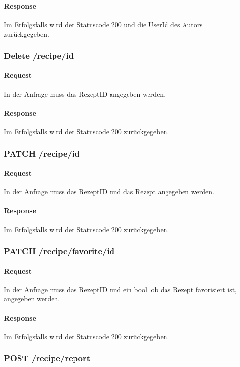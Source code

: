 \documentclass{entwurfsheft}
\begin{document}
    \paragraph{Response}
        Im Erfolgsfalls wird der Statuscode 200 und die UserId des Autors zurückgegeben.

\subsubsection*{Delete /recipe/id}
    \paragraph{Request}
        In der Anfrage muss das RezeptID angegeben werden.
    \paragraph{Response}
        Im Erfolgsfalls wird der Statuscode 200 zurückgegeben.

\subsubsection*{PATCH /recipe/id}
    \paragraph{Request}
        In der Anfrage muss das RezeptID und das Rezept angegeben werden.
    \paragraph{Response}
        Im Erfolgsfalls wird der Statuscode 200 zurückgegeben.

\subsubsection*{PATCH /recipe/favorite/id}
    \paragraph{Request}
        In der Anfrage muss das RezeptID und ein \gls{bool}, ob das Rezept favorisiert ist, angegeben werden.
    \paragraph{Response}
        Im Erfolgsfalls wird der Statuscode 200 zurückgegeben.
        
\subsubsection*{POST /recipe/report}
\end{document}
